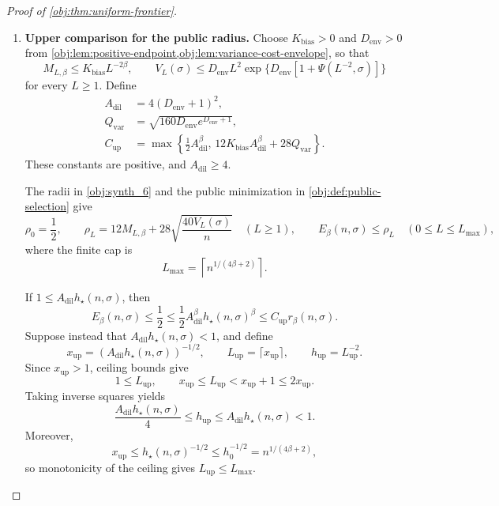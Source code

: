 \begin{proof}[Proof of \cref{obj:thm:uniform-frontier}]
\begin{enumerate}
\item \textbf{Upper comparison for the public radius.}
Choose \(K_{\mathrm{bias}}>0\) and \(D_{\mathrm{env}}>0\) from
\cref{obj:lem:positive-endpoint,obj:lem:variance-cost-envelope}, so that
\[
M_{L,\beta}\le K_{\mathrm{bias}}L^{-2\beta},
\qquad
V_L(\sigma)\le D_{\mathrm{env}}L^2
 \exp\{D_{\mathrm{env}}[1+\Psi(L^{-2},\sigma)]\}
\]
for every \(L\ge1\). Define
\[
\begin{aligned}
A_{\mathrm{dil}}&=4(D_{\mathrm{env}}+1)^2,\\
Q_{\mathrm{var}}&=\sqrt{160D_{\mathrm{env}}e^{D_{\mathrm{env}}+1}},\\
C_{\mathrm{up}}&=\max\left\{
 \frac12A_{\mathrm{dil}}^\beta,\,
 12K_{\mathrm{bias}}A_{\mathrm{dil}}^\beta+28Q_{\mathrm{var}}
 \right\}.
\end{aligned}
\]
These constants are positive, and \(A_{\mathrm{dil}}\ge4\).

The radii in \cref{obj:synth_6} and the public minimization in
\cref{obj:def:public-selection} give
\[
\rho_0=\frac12,\qquad
\rho_L=12M_{L,\beta}+28\sqrt{\frac{40V_L(\sigma)}n}\quad(L\ge1),
\qquad
E_\beta(n,\sigma)\le\rho_L\quad(0\le L\le L_{\max}),
\]
where the finite cap is
\[
L_{\max}=\left\lceil n^{1/(4\beta+2)}\right\rceil.
\]

If \(1\le A_{\mathrm{dil}}h_\star(n,\sigma)\), then
\[
E_\beta(n,\sigma)\le\frac12
\le\frac12A_{\mathrm{dil}}^\beta h_\star(n,\sigma)^\beta
\le C_{\mathrm{up}}r_\beta(n,\sigma).
\]
Suppose instead that \(A_{\mathrm{dil}}h_\star(n,\sigma)<1\), and define
\[
x_{\mathrm{up}}
=(A_{\mathrm{dil}}h_\star(n,\sigma))^{-1/2},
\qquad
L_{\mathrm{up}}=\lceil x_{\mathrm{up}}\rceil,
\qquad
h_{\mathrm{up}}=L_{\mathrm{up}}^{-2}.
\]
Since \(x_{\mathrm{up}}>1\), ceiling bounds give
\[
1\le L_{\mathrm{up}},
\qquad
x_{\mathrm{up}}\le L_{\mathrm{up}}
<x_{\mathrm{up}}+1\le2x_{\mathrm{up}}.
\]
Taking inverse squares yields
\[
\frac{A_{\mathrm{dil}}h_\star(n,\sigma)}4
\le h_{\mathrm{up}}
\le A_{\mathrm{dil}}h_\star(n,\sigma)<1.
\]
Moreover,
\[
x_{\mathrm{up}}
\le h_\star(n,\sigma)^{-1/2}
\le h_0^{-1/2}
=n^{1/(4\beta+2)},
\]
so monotonicity of the ceiling gives \(L_{\mathrm{up}}\le L_{\max}\).


\end{enumerate}
\end{proof}
